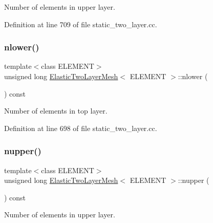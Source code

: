 Number of elements in upper layer. 



Definition at line 709 of file static\+\_\+two\+\_\+layer.\+cc.

\mbox{\label{classElasticTwoLayerMesh_a144f4d44005a25bb301955625a79c9ef}} 
\subsubsection{\texorpdfstring{nlower()}{nlower()}}
{\footnotesize\ttfamily template$<$class E\+L\+E\+M\+E\+NT$>$ \\
unsigned long \hyperlink{classElasticTwoLayerMesh}{Elastic\+Two\+Layer\+Mesh}$<$ E\+L\+E\+M\+E\+NT $>$\+::nlower (\begin{DoxyParamCaption}{ }\end{DoxyParamCaption}) const\hspace{0.3cm}{\ttfamily [inline]}}



Number of elements in top layer. 



Definition at line 698 of file static\+\_\+two\+\_\+layer.\+cc.

\mbox{\label{classElasticTwoLayerMesh_ae5c586ecab2ac275174427a94ccfc0c7}} 
\subsubsection{\texorpdfstring{nupper()}{nupper()}}
{\footnotesize\ttfamily template$<$class E\+L\+E\+M\+E\+NT$>$ \\
unsigned long \hyperlink{classElasticTwoLayerMesh}{Elastic\+Two\+Layer\+Mesh}$<$ E\+L\+E\+M\+E\+NT $>$\+::nupper (\begin{DoxyParamCaption}{ }\end{DoxyParamCaption}) const\hspace{0.3cm}{\ttfamily [inline]}}



Number of elements in upper layer. 



